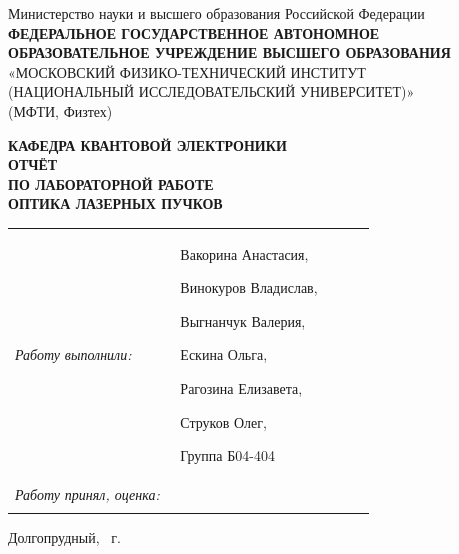 \documentclass[12pt, a4paper]{article}
\begin{document}

\begin{titlepage}
\thispagestyle{empty}

\begin{center}
\small
Министерство науки и высшего образования Российской Федерации\\[2mm]
\textbf{ФЕДЕРАЛЬНОЕ ГОСУДАРСТВЕННОЕ АВТОНОМНОЕ
ОБРАЗОВАТЕЛЬНОЕ УЧРЕЖДЕНИЕ ВЫСШЕГО ОБРАЗОВАНИЯ}\\[1mm]
«МОСКОВСКИЙ ФИЗИКО-ТЕХНИЧЕСКИЙ ИНСТИТУТ\\
(НАЦИОНАЛЬНЫЙ ИССЛЕДОВАТЕЛЬСКИЙ УНИВЕРСИТЕТ)»\\
(МФТИ, Физтех)
\end{center}

\vspace{18mm}

\begin{center}
\large \textbf{КАФЕДРА КВАНТОВОЙ ЭЛЕКТРОНИКИ}\\[10mm]
\Large \textbf{ОТЧЁТ}\\[2mm]
\large \textbf{ПО ЛАБОРАТОРНОЙ РАБОТЕ}\\[14mm]
\Large \textbf{ОПТИКА ЛАЗЕРНЫХ ПУЧКОВ}
\end{center}

\vfill

\noindent
\begin{tabular}{@{}p{0.44\linewidth}p{0.52\linewidth}@{}}
\textit{Работу выполнили:} & Вакорина Анастасия,

Винокуров Владислав,

Выгнанчук Валерия,

Ескина Ольга,

Рагозина Елизавета,

Струков Олег,

Группа Б04-404 \\[8mm]

\textit{Работу принял, оценка:} & \\[3mm]
 \\
\end{tabular}


\vspace{12mm}

\begin{center}
\small Долгопрудный, \the\year{}~г.
\end{center}

\end{titlepage}
\end{document}
